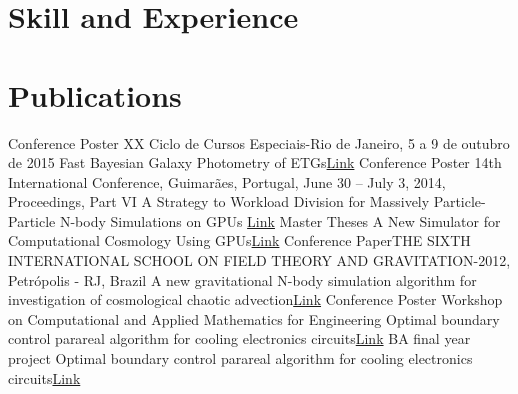 \documentclass[11pt,a4paper]{moderncv}
\begin{document}
\section{Skill and Experience}

\section{Publications}

\cventry{} {Conference Poster }{XX Ciclo de Cursos Especiais-Rio de Janeiro, 5 a 9 de outubro de 2015 } { Fast Bayesian Galaxy Photometry of ETGs}{\href{http://www.researchgate.net/publication/284719772_Fast_Bayesian_Galaxy_Photometry_of_ETGs}{Link}} {} 
\cventry{} {Conference Poster } {14th International Conference, Guimarães, Portugal, June 30 – July 3, 2014, Proceedings, Part VI} { A Strategy to Workload Division for Massively Particle-Particle N-body Simulations on GPUs} {\href{http://dx.doi.org/10.1007/978-3-319-09153-2_34}{Link}} {} 
\cventry{} {Master Theses} {}   { A New Simulator for Computational Cosmology Using GPUs}{\href{http://mtc-m16d.sid.inpe.br/col/sid.inpe.br/mtc-m19/2013/02.08.17.58/doc/publicacao.pdf}{Link}} {}  
\cventry{} {Conference Paper}{THE SIXTH INTERNATIONAL SCHOOL ON FIELD THEORY AND GRAVITATION-2012, Petrópolis - RJ, Brazil}  {A new gravitational N-body simulation algorithm for investigation of cosmological chaotic advection}{\href{http://scitation.aip.org/content/aip/proceeding/aipcp/10.1063/1.4756992}{Link}} {} 
 {} 
\cventry{} {Conference Poster} { Workshop on Computational and Applied Mathematics for Engineering} { Optimal boundary control parareal algorithm for cooling electronics circuits}{\href{http://www.researchgate.net/publication/267368910_Optimal_boundary_control_parareal_algorithm_for_cooling_electronics_circuits}{Link}} {} 
\cventry{} {BA final year project}{} {Optimal boundary control parareal algorithm for cooling electronics circuits}{\href{http://www.cc.pol.una.py/~cschaer/thesis.html}{Link}} {} 
\end{document}
